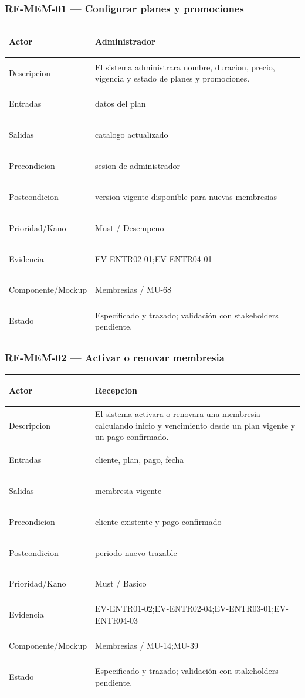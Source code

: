 \documentclass[11pt,a4paper,twoside]{article}
\begin{document}
\subsubsection{RF-MEM-01 — Configurar planes y promociones}
\begingroup
\renewcommand{\arraystretch}{1.12}
\setlength{\tabcolsep}{5pt}
\begin{tabularx}{\textwidth}{|>{\bfseries\raggedright\arraybackslash}p{3.35cm}|>{\raggedright\arraybackslash}X|}
\hline
Actor & Administrador \\ \hline
Descripcion & El sistema administrara nombre, duracion, precio, vigencia y estado de planes y promociones. \\ \hline
Entradas & datos del plan \\ \hline
Salidas & catalogo actualizado \\ \hline
Precondicion & sesion de administrador \\ \hline
Postcondicion & version vigente disponible para nuevas membresias \\ \hline
Prioridad/Kano & Must / Desempeno \\ \hline
Evidencia & EV-ENTR02-01;EV-ENTR04-01 \\ \hline
Componente/Mockup & Membresias / MU-68 \\ \hline
Estado & Especificado y trazado; validación con stakeholders pendiente. \\ \hline
\end{tabularx}
\endgroup

\subsubsection{RF-MEM-02 — Activar o renovar membresia}
\begingroup
\renewcommand{\arraystretch}{1.12}
\setlength{\tabcolsep}{5pt}
\begin{tabularx}{\textwidth}{|>{\bfseries\raggedright\arraybackslash}p{3.35cm}|>{\raggedright\arraybackslash}X|}
\hline
Actor & Recepcion \\ \hline
Descripcion & El sistema activara o renovara una membresia calculando inicio y vencimiento desde un plan vigente y un pago confirmado. \\ \hline
Entradas & cliente, plan, pago, fecha \\ \hline
Salidas & membresia vigente \\ \hline
Precondicion & cliente existente y pago confirmado \\ \hline
Postcondicion & periodo nuevo trazable \\ \hline
Prioridad/Kano & Must / Basico \\ \hline
Evidencia & EV-ENTR01-02;EV-ENTR02-04;EV-ENTR03-01;EV-ENTR04-03 \\ \hline
Componente/Mockup & Membresias / MU-14;MU-39 \\ \hline
Estado & Especificado y trazado; validación con stakeholders pendiente. \\ \hline
\end{tabularx}
\endgroup
\end{document}
